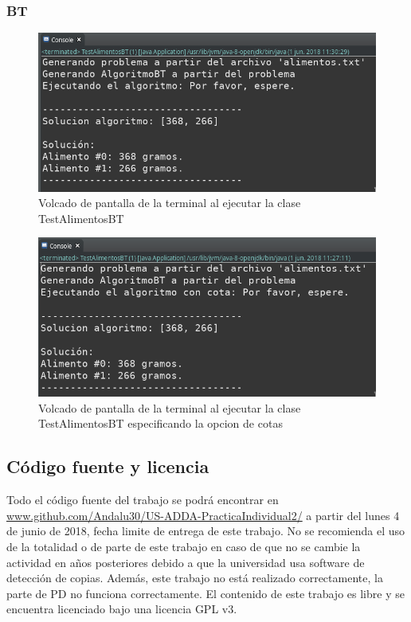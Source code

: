 \documentclass[a4paper,12pt]{article}
\begin{document}
\subsubsection{BT}
\begin{figure}[H]
  \centering
  \includegraphics[scale=0.5]{btSinfiltro.png}
  \caption{Volcado de pantalla de la terminal al ejecutar la clase TestAlimentosBT}
  \label{fig:btsincota}
\end{figure}
\begin{figure}[H]
  \centering
  \includegraphics[scale=0.5]{btCota.png}
  \caption{Volcado de pantalla de la terminal al ejecutar la clase TestAlimentosBT especificando la opcion de cotas}
  \label{fig:btconcota}
\end{figure}

\subsection{Código fuente y licencia}
Todo el código fuente del trabajo se podrá encontrar en \url{www.github.com/Andalu30/US-ADDA-PracticaIndividual2/}
a partir del lunes 4 de junio de 2018, fecha limite de entrega de este trabajo.
No se recomienda el uso de la totalidad o de parte de este trabajo en caso de que no se cambie la actividad en años posteriores debido a que la universidad usa software de detección de copias. Además, este trabajo no está realizado correctamente, la parte de PD no funciona correctamente.
El contenido de este trabajo es libre y se encuentra licenciado bajo una licencia GPL v3.\\
\end{document}
